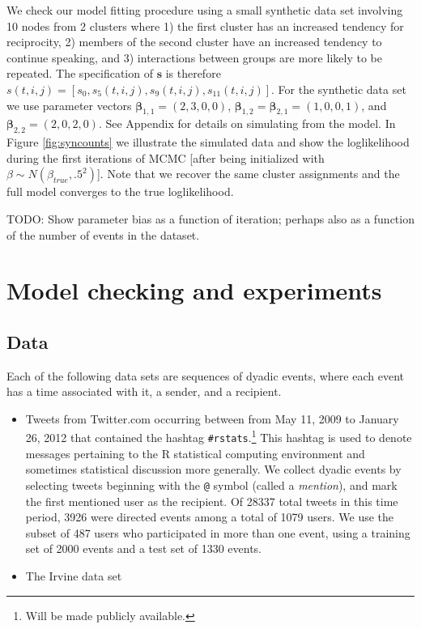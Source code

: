 \documentclass[11pt]{article}
\begin{document}
We check our model fitting procedure using a small synthetic data set involving 10 nodes from 2 clusters where 1) the first cluster has an increased tendency for reciprocity, 2) members of the second cluster have an increased tendency to continue speaking, and 3) interactions between groups are more likely to be repeated.  The specification of $\textbf{s}$ is therefore $s(t,i,j) = [s_0, s_{5}(t,i,j), s_{9}(t,i,j), s_{11}(t,i,j)]$.  For the synthetic data set we use parameter vectors $\boldsymbol{\beta}_{1,1} = (2,3,0,0)$,  $\boldsymbol{\beta}_{1,2} = \boldsymbol{\beta}_{2,1} = (1,0,0,1)$, and $\boldsymbol{\beta}_{2,2} = (2,0,2,0)$.  See Appendix for details on simulating from the model.  In Figure \ref{fig:syncounts} we illustrate the simulated data and show the loglikelihood during the first iterations of MCMC [after being initialized with $\beta \sim N(\beta_{true},.5^2)$].  Note that we recover the same cluster assignments and the full model converges to the true loglikelihood.

TODO: Show parameter bias as a function of iteration; perhaps also as a function of the number of events in the dataset.

\section{Model checking and experiments}

\subsection*{Data}

Each of the following data sets are sequences of dyadic events, where each event has a time associated with it, a sender, and a recipient.

\begin{itemize}
\item Tweets from Twitter.com occurring between from May 11, 2009 to January 26, 2012 that contained the hashtag \texttt{\#rstats}.\footnote{Will be made publicly available.}  This hashtag is used to denote messages pertaining to the R statistical computing environment and sometimes statistical discussion more generally.  We collect dyadic events by selecting tweets beginning with the \texttt{@} symbol (called a \emph{mention}), and mark the first mentioned user as the recipient.  Of 28337 total tweets in this time period, 3926 were directed events among a total of 1079 users.  We use the subset of 487 users who participated in more than one event, using a training set of 2000 events and a test set of 1330 events.
\item The Irvine data set
\end{itemize}
\end{document}
